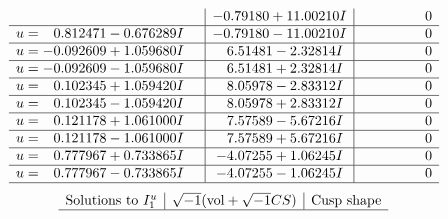\documentclass[1p]{elsarticle_modified}
\theoremstyle{definition}
\newcommand{\I}{\sqrt{-1}}
\begin{document}
$$\begin{array}{c|c|c}
 & -0.79180 + 11.00210 I & \phantom{-0.000000 } 0 \\ \hline\begin{aligned}
u &= \phantom{-}0.812471 - 0.676289 I\end{aligned}
 & -0.79180 - 11.00210 I & \phantom{-0.000000 } 0 \\ \hline\begin{aligned}
u &= -0.092609 + 1.059680 I\end{aligned}
 & \phantom{-}6.51481 - 2.32814 I & \phantom{-0.000000 } 0 \\ \hline\begin{aligned}
u &= -0.092609 - 1.059680 I\end{aligned}
 & \phantom{-}6.51481 + 2.32814 I & \phantom{-0.000000 } 0 \\ \hline\begin{aligned}
u &= \phantom{-}0.102345 + 1.059420 I\end{aligned}
 & \phantom{-}8.05978 - 2.83312 I & \phantom{-0.000000 } 0 \\ \hline\begin{aligned}
u &= \phantom{-}0.102345 - 1.059420 I\end{aligned}
 & \phantom{-}8.05978 + 2.83312 I & \phantom{-0.000000 } 0 \\ \hline\begin{aligned}
u &= \phantom{-}0.121178 + 1.061000 I\end{aligned}
 & \phantom{-}7.57589 - 5.67216 I & \phantom{-0.000000 } 0 \\ \hline\begin{aligned}
u &= \phantom{-}0.121178 - 1.061000 I\end{aligned}
 & \phantom{-}7.57589 + 5.67216 I & \phantom{-0.000000 } 0 \\ \hline\begin{aligned}
u &= \phantom{-}0.777967 + 0.733865 I\end{aligned}
 & -4.07255 + 1.06245 I & \phantom{-0.000000 } 0 \\ \hline\begin{aligned}
u &= \phantom{-}0.777967 - 0.733865 I\end{aligned}
 & -4.07255 - 1.06245 I & \phantom{-0.000000 } 0\\
 \hline 
 \end{array}$$\newpage$$\begin{array}{c|c|c}  
\text{Solutions to }I^u_{1}& \I (\text{vol} + \sqrt{-1}CS) & \text{Cusp shape}\\
 \hline 

\end{array}$$
\end{document}
